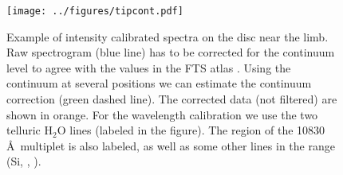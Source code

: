 \begin{figure}[t]
\center
\texttt{[image: ../figures/tipcont.pdf]}
\caption{Example of intensity calibrated spectra on the disc near the limb. Raw spectrogram (blue line) has to be corrected for the continuum level to agree with the values in the FTS atlas \citep[][ black line]{Neckel:1999lr}. Using the continuum at several positions we can estimate the continuum correction (green dashed line). The corrected data (not filtered) are shown in orange. For the wavelength calibration we use the two telluric  H$_{2}$O lines (labeled in the figure). The region of the  10830 \AA\  multiplet is also labeled, as well as some other lines in the range (Si,  , ).}
\label{fig:tip:cont}
\end{figure}


